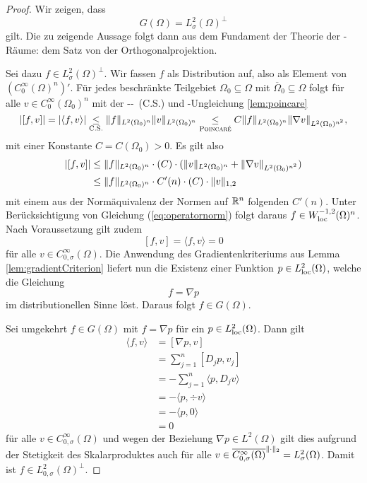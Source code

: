 \begin{proof}
  Wir zeigen, dass 
  \begin{equation}
    \label{eq:orthComplement}
    G(\Omega) = L_\sigma^2(\Omega)^\perp
  \end{equation}
  gilt.
  Die zu zeigende Aussage folgt dann aus dem Fundament der Theorie der \hilbert\hyp{}Räume: dem Satz von der Orthogonalprojektion.

  Sei dazu $f \in L_\sigma^2(\Omega)^\perp$.
  Wir fassen $f$ als Distribution auf, also als Element von $(C_0^\infty(\Omega)^n)'$.
  Für jedes beschränkte Teilgebiet $\Omega_0 \subseteq \Omega$ mit $\overline\Omega_0 \subseteq \Omega$ folgt für alle $v \in C_0^\infty(\Omega_0)^n$ mit der \cauchy\hyp\schwartz-\ (C.S.) und \poincare\hyp{}Ungleichung \ref{lem:poincare}
  $$
  |[f, v]| 
  = |\langle f, v \rangle| 
  \underset{\textsc{C.S.}}{\leq}  \norm{f}_{L^2(\Omega_0)^n} \norm{v}_{L^2(\Omega_0)^n}
  \underset{\poincare}{\leq} C \norm{f}_{L^2(\Omega_0)^n} \norm{\nabla v}_{L^2(\Omega_0)^{n^2}},
  $$
  mit einer Konstante $C = C(\Omega_0) > 0$.
  Es gilt also 
  \begin{align*}
    |[f, v]| 
    &\leq \norm{f}_{L^2(\Omega_0)^n} \cdot ( C ) \cdot (\norm{v}_{L^2(\Omega_0)^n} + \norm{\nabla v}_{L^2(\Omega_0)^{n^2}}) \\
    &\leq \norm{f}_{L^2(\Omega_0)^n} \cdot C'(n) \cdot ( C ) \cdot \norm{v}_{1,2}
  \end{align*}
  mit einem aus der Normäquivalenz der Normen auf $\R^n$ folgenden $C'(n)$.
  Unter Berücksichtigung von Gleichung (\ref{eq:operatornorm}) folgt daraus $f \in W_{\loc}^{-1,2}(\Omega)^n$.
  Nach Voraussetzung gilt zudem 
  $$
  [f,v] = \langle f, v \rangle = 0
  $$
  für alle $v \in C_{0, \sigma}^\infty(\Omega)$.
  Die Anwendung des Gradientenkriteriums aus Lemma \ref{lem:gradientCriterion} liefert nun die Existenz einer Funktion $p \in L_{\loc}^2(\Omega)$, welche die Gleichung
  $$
  f = \nabla p
  $$
  im distributionellen Sinne löst.
  Daraus folgt $f \in G(\Omega)$.

  Sei umgekehrt $f \in G(\Omega)$ mit $f = \nabla p$ für ein $p \in L^2_{\loc}(\Omega)$.
  Dann gilt
  \begin{align*}
  \langle f, v \rangle
  &= [ \nabla p, v ] \\
  &= \sum_{j = 1}^n [ D_j p , v_j ] \\
  &= - \sum_{j = 1}^n \langle p, D_j v \rangle \\
  &= - \langle p, \div v \rangle  \\
  &= - \langle p, 0 \rangle  \\
  &= 0
  \end{align*}
  für alle $v \in C_{0, \sigma}^\infty(\Omega)$ und wegen der Beziehung $\nabla p \in L^2(\Omega)$ gilt dies aufgrund der Stetigkeit des Skalarproduktes auch für alle $v \in \overline{C_{0, \sigma}^\infty(\Omega)}^{\norm{\cdot}_2} = L_\sigma^2(\Omega)$.
  Damit ist $f \in L_{0,\sigma}^2(\Omega)^\perp$.
\end{proof}

